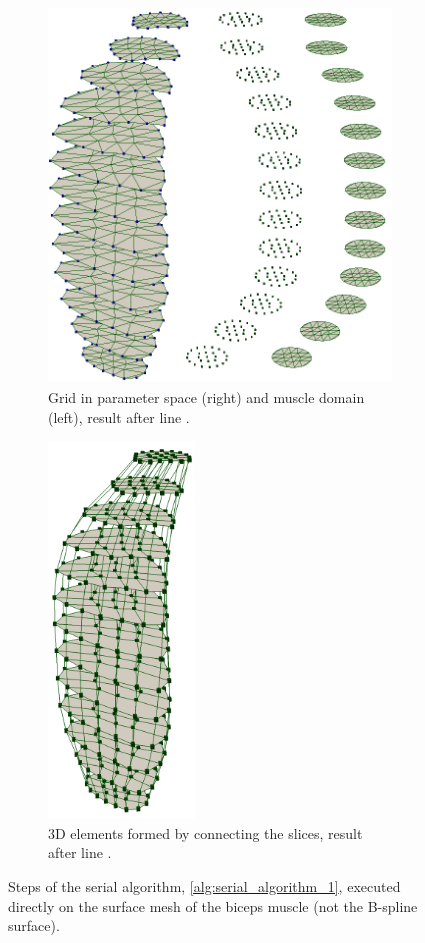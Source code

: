 \begin{figure}
\begin{subfigure}[t]{0.48\textwidth}
    \label{fig:serial_alg_3}%
  \end{subfigure}\\
  \centering%
  \begin{subfigure}[t]{0.49\textwidth}%
    \centering%
    \includegraphics[height=10cm]{images/fiber_creation/serial_alg_4.png}%
    \caption{Grid in parameter space (right) and muscle domain (left), result after line .}%
    \label{fig:serial_alg_4}%
  \end{subfigure}
  \hfill{}
  \begin{subfigure}[t]{0.4\textwidth}%
    \centering%
    \includegraphics[height=10cm]{images/fiber_creation/serial_alg_8.png}%
    \caption{3D elements formed by connecting the slices, result after line .}%
    \label{fig:serial_alg_8}%
  \end{subfigure}
  \caption{Steps of the serial algorithm, \cref{alg:serial_algorithm_1}, executed directly on the surface mesh of the biceps muscle (not the B-spline surface).}%
  \label{fig:serial_alg}%
\end{figure}%
%

